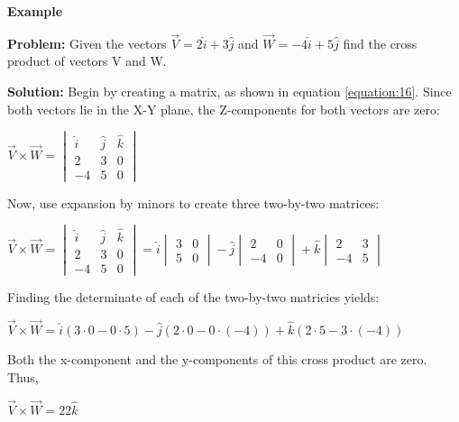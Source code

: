 	\begin{mdframed}[backgroundcolor=blue!10!white]
	\begin{center}
		\textbf{Example \thesubsection}	\label{example:crossproductcartesian}
		\vspace{0.1in}
		
		
	\end{center}
	
	\textbf{Problem:} Given the vectors $ \vec{V} = 2 \hat{i} + 3 \hat{j} $ and $\vec{W} = -4 \hat{i} + 5 \hat{j}$ find the cross product of vectors V and W. 
	
	\vspace{.1in}
	
	\textbf{Solution:}  Begin by creating a matrix, as shown in equation \eqref{equation:16}.  Since both vectors lie in the X-Y plane, the Z-components for both vectors are zero:
	
	\begin{center}
		$\vec{V} \times \vec{W} =  \begin{vmatrix}
		\hat{i} & \hat{j} & \hat{k} \\
		2 & 3 & 0\\
		-4 & 5 & 0		
		\end{vmatrix}$

	\end{center}

Now, use expansion by minors to create three two-by-two matrices:

\begin{center}
	$\vec{V} \times \vec{W} =  \begin{vmatrix}
	\hat{i} & \hat{j} & \hat{k} \\
	2 & 3 & 0\\
	-4 & 5 & 0		
	\end{vmatrix} = \hat{i} \begin{vmatrix}
		3 & 0 \\
		5 & 0 
	\end{vmatrix} - \hat{j} \begin{vmatrix}
		2 & 0 \\
		-4 & 0 
	\end{vmatrix} + \hat{k} \begin{vmatrix}
		2 & 3 \\
		-4 & 5 
	\end{vmatrix}
	$
\end{center}

Finding the determinate of each of the two-by-two matricies yields: 
\begin{center}
	$	\vec{V} \times \vec{W} = \hat{i}(3\cdot0-0\cdot5)-\hat{j}(2\cdot0-0\cdot(-4))+\hat{k}(2\cdot5-3\cdot(-4))$
\end{center}

Both the x-component and the y-components of this cross product are zero.  Thus, 
\begin{center}
	$	\boxed{\vec{V} \times \vec{W} = 22 \hat{k}}$
\end{center}


\end{mdframed}
	
